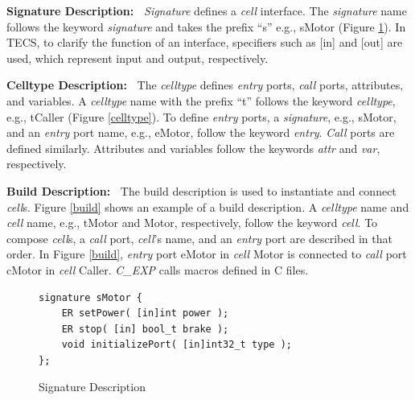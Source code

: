 \documentclass[conference]{IEEEtran/IEEEtran/IEEEtran}
\begin{document}
    {\bf Signature Description:\ }%
        {\it Signature} defines a {\it cell} interface.
        The {\it signature} name follows the keyword {\it signature} and takes the prefix ``s'' e.g., sMotor (Figure \ref{signature}).
        In TECS, to clarify the function of an interface, specifiers such as [in] and [out] are used, which represent input and output, respectively.

    {\bf Celltype Description:\ }%
        The {\it celltype} defines {\it entry} ports, {\it call} ports, attributes, and variables.
        A {\it celltype} name with the prefix ``t'' follows the keyword {\it celltype}, e.g., tCaller (Figure \ref{celltype}).
        To define {\it entry} ports, a {\it signature}, e.g., sMotor, and an {\it entry} port name, e.g., eMotor, follow the keyword {\it entry}.
        {\it Call} ports are defined similarly.
        Attributes and variables follow the keywords {\it attr} and {\it var}, respectively.
    
    {\bf Build Description:\ }%
        The build description is used to instantiate and connect {\it cell}s.
        Figure \ref{build} shows an example of a build description.
        A {\it celltype} name and {\it cell} name, e.g., tMotor and Motor, respectively, follow the keyword {\it cell}.
        To compose {\it cell}s, a {\it call} port, {\it cell}'s name, and an {\it entry} port are described in that order.
        In Figure \ref{build}, {\it entry} port eMotor in {\it cell} Motor is connected to {\it call} port cMotor in {\it cell} Caller.
        {\it C\_EXP} calls macros defined in C files.
        


\begin{figure}[H]
\centering
\begin{lstlisting}
signature sMotor {
    ER setPower( [in]int power );
    ER stop( [in] bool_t brake );
    void initializePort( [in]int32_t type );
};
\end{lstlisting}
    \vspace{-2mm}
\caption{Signature Description}
    \vspace{-5mm}
\label{signature}
\end{figure}
\end{document}
